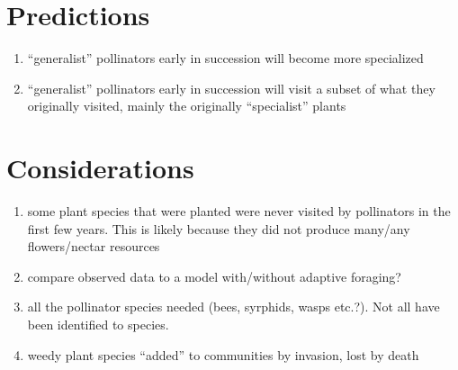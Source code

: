 \documentclass[12pt]{article}
\begin{document}
\section{Predictions}
\begin{enumerate}
\item ``generalist'' pollinators early in succession will become more
  specialized
\item ``generalist'' pollinators early in succession will visit a
  subset of what they originally visited, mainly the originally
  ``specialist'' plants
\end{enumerate}

\section{Considerations}
\begin{enumerate}
\item some plant species that were planted were never visited by
  pollinators in the first few years. This is likely because they did
  not produce many/any flowers/nectar resources
\item compare observed data to a model with/without adaptive foraging?
\item all the pollinator species needed (bees, syrphids, wasps
  etc.?). Not all have been identified to species.
\item weedy plant species ``added'' to communities by invasion, lost
  by death
\end{enumerate}
\end{document}
